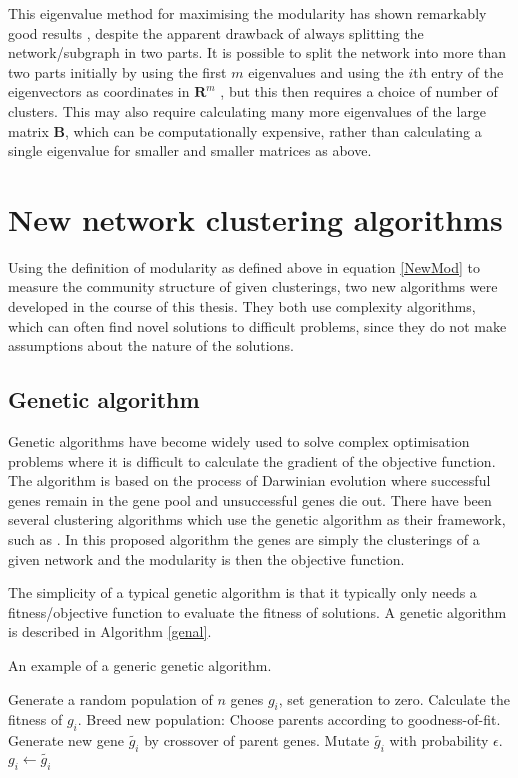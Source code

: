 This eigenvalue method for maximising the modularity has shown
remarkably good results \citep{Newman2006a}, despite the apparent drawback of always splitting the 
network/subgraph in two parts.  It is possible to split the network into more than two parts initially by using the first $m$ 
eigenvalues and using the $i$th entry of the eigenvectors as coordinates in 
$\mathbf{R}^{m}$ \citep{Humphries2011a}, but this then requires a choice of 
number of clusters.  This may also 
require calculating many more eigenvalues of the large matrix $\mathbf{B}$, 
which can be computationally expensive, rather than calculating a single eigenvalue for smaller and smaller matrices as above.  


\section{New network clustering algorithms}
Using the definition of modularity as defined above in equation \ref{NewMod} to measure the community structure of given clusterings, two new algorithms were developed in the course of this thesis.  They both use complexity algorithms, which can often find novel solutions to difficult problems, since they do not make assumptions about the nature of the solutions.

\subsection{Genetic algorithm}
Genetic algorithms have become widely used to solve complex optimisation problems where it is difficult to calculate the gradient of the objective function.  The algorithm is based on the process of Darwinian evolution where successful genes remain in the gene pool and unsuccessful genes die out.  There have been several clustering algorithms which use the genetic algorithm as their framework, such as \citep{Pizzuti2008a}. In this proposed algorithm the genes are simply the clusterings of a given network and the modularity is then the objective function.

The simplicity of a typical genetic algorithm is that it typically only needs a fitness/objective function to evaluate the fitness of solutions.  A genetic algorithm is described in Algorithm \ref{genal}.

\begin{algorithm}
\caption{An example of a generic genetic algorithm.}
\label{genal}
\begin{algorithmic}
\STATE Generate a random population of $n$ genes $g_i$, set generation to zero.
\STATE Calculate the fitness of $g_i$.
\ENDFOR
\STATE Breed new population:
\STATE Choose parents according to goodness-of-fit.
\STATE Generate new gene $\tilde{g_i}$ by crossover of parent genes.
\STATE Mutate $\tilde{g_i}$ with probability $\epsilon$.
\ENDFOR
{} \STATE $g_i \leftarrow \tilde{g_i}$ \ENDFOR
\ENDWHILE
\end{algorithmic}
\end{algorithm}

